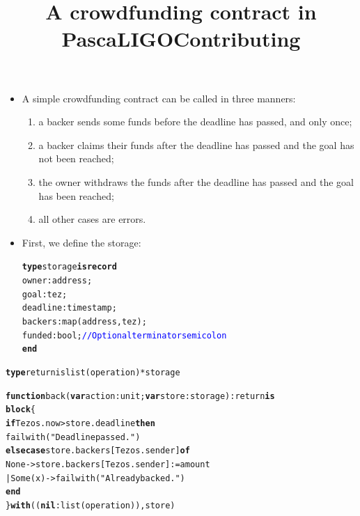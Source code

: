 \documentclass[wide]{slides}
\newcommand{\Kblock}[0]{\textbf{block}\xspace}
\newcommand{\Kcase}[0]{\textbf{case}\xspace}
\newcommand{\Kelse}[0]{\textbf{else}\xspace}
\newcommand{\Kend}[0]{\textbf{end}\xspace}
\newcommand{\Kfunction}[0]{\textbf{function}\xspace}
\newcommand{\Kif}[0]{\textbf{if}\xspace}
\newcommand{\Kis}[0]{\textbf{is}\xspace}
\newcommand{\Knil}[0]{\textbf{nil}\xspace}
\newcommand{\Kof}[0]{\textbf{of}\xspace}
\newcommand{\Kthen}[0]{\textbf{then}\xspace}
\newcommand{\Ktype}[0]{\textbf{type}\xspace}
\newcommand{\Kvar}[0]{\textbf{var}\xspace}
\newcommand{\Kwith}[0]{\textbf{with}\xspace}
\newcommand{\com}[1]{\textcolor{blue}{{#1}}}
\begin{document}
\begin{slide}
  \title{A crowdfunding contract in PascaLIGO}

  \begin{itemize}

    \item A simple crowdfunding contract can be called in three
      manners:
      \begin{enumerate}

        \item a backer sends some funds before the deadline has
          passed, and only once;

        \item a backer claims their funds after the deadline has
          passed and the goal has not been reached;

        \item the owner withdraws the funds after the deadline has
          passed and the goal has been reached;

        \item all other cases are errors.

      \end{enumerate}

      \item First, we define the storage:
  \begin{alltt}
\textbf{type} storage \textbf{is} \textbf{record}
    owner     : address;
    goal      : tez;
    deadline : timestamp;
    backers  : map (address, tez);
    funded   : bool;            \com{// Optional terminator semicolon}
  \textbf{end}
  \end{alltt}

  \end{itemize}

\end{slide}

\begin{slide}
  \title{Contributing}

  \begin{alltt}
\Ktype return is list (operation) * storage

\Kfunction back (\Kvar action : unit; \Kvar store : storage) : return \Kis
  \Kblock \{
    \Kif Tezos.now > store.deadline \Kthen
      failwith ("Deadline passed.")
    \Kelse \Kcase store.backers[Tezos.sender] \Kof
            None -> store.backers[Tezos.sender] := amount
          | Some (x) -> failwith ("Already backed.")
          \Kend
  \} \Kwith ((\Knil : list (operation)), store)
  \end{alltt}

\end{slide}
\end{document}
